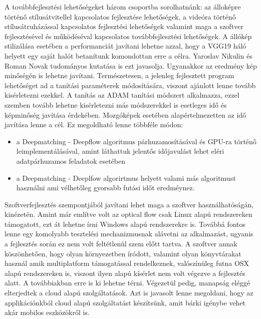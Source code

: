 \documentclass[12pt, a4paper, oneside]{book}
\theoremstyle{tetel}
\begin{document}
A továbbfejlesztési lehetőségeket három csoportba sorolhatnánk: az álloképre történő stílusátvitellel kapcsolatos fejlesztése lehetőségek, a videóra történő stílusátruházással kapcsolatos fejlesztési lehetőségek valamint maga a szoftver fejlesztésével és működéséval kapcsolatos továbbfejlesztési lehetőségek.
\newline
\indent
A állókép stilizálása esetében a performanciát javítani lehetne azzal, hogy a VGG19 háló helyett egy saját halót betanítunk komondottan erre a célra. Yaroslav Nikulin és Roman Novak tudományos kutatása\cite{16} is ezt javasolja. Ugyanakkor az eredmény kép minőségén is lehetne javítani. Természetesen, a jelenleg fejlesztett program lehetőséget ad a tanítási paraméterek módosítására, viszont ajánlott lenne tovább kisérletezni ezekkel. A tanítás az ADAM tanítási módszert alkalmazza, ezzel szemben tovább lehetne kisérletezni más módszerekkel is esetleges idő és képminőség javítása érdekében.
\newline
\indent
Mozgóképek esetében alapértelmezetten az idő javítása lenne a cél. Ez megoldható lenne többféle módon:
\begin{itemize}
	\item a Deepmatching - Deepflow algoritmus párhuzamosításával és GPU-ra történő leimplementálásával, amint láthattuk jelentős időjavulást lehet eléri adatpárhuzamos feladatok esetében
	\item a Deepmatching - Deeplfow algorirtmus helyett valami más algoritmust használni ami vélhetőleg gyorsabb futási időt eredméynez.
\end{itemize}

Szoftverfejlesztés szempontjából javítani lehet maga a szoftver használhatóságán, kinézetén. Amint már említve volt az optical flow csak Linux alapú rendszereken támogatott, ezt át lehetne írni Windows alapú rendszerekre is. Továbbá fontos lenne egy komolyabb tesztelési mechanizmusnak alávetni az alkalmazást, ugyanis a fejlesztés során ez nem volt feltétlenül szem előtt tartva.
\newline
\indent
A szoftver annak köszönhetően, hogy olyan környezetben íródott, valamint olyan könyvtárakat használ amik multiplatform támogatással rendelkeznek, valószínüleg futna OSX alapú rendszereken is, viszont ilyen alapú kísérlet nem volt végezve a fejlesztés alatt. A továbbiakban erre is ki lehetne térni. 
\newline
\indent
Végezetül pedig, manapság eléggé elterjedtek a cloud alapú szolgáltatások. Azt is javasolt lenne megoldani, hogy az applikációnkból cloud alapú szolgáltatást készítsünk, amit bárki igénybe vehet akár mobilos eszközökről is.
\end{document}
